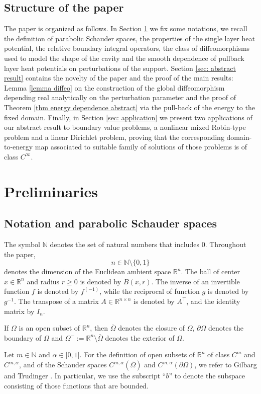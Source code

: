 \documentclass[11pt,reqno,a4paper]{amsart}
\theoremstyle{plain}
\theoremstyle{definition}
\newcommand{\R}{\mathbb{R}}
\begin{document}
\subsection{Structure of the paper} The paper is organized as follows. In Section \ref{s:prel} we fix some notations, we recall the definition of parabolic Schauder spaces, the properties of the single layer heat potential, the relative boundary integral operators, the class of diffeomorphisms used to model the shape of the cavity and the smooth dependence of pullback layer heat potentials on perturbations of the support. Section \ref{sec: abstract result} contains the novelty of the paper and the proof of the main results: Lemma \ref{lemma diffeo} on the construction of the global diffeomorphism depending real analytically on the perturbation parameter and the proof of Theorem \ref{thm energy dependence abstract} via the pull-back of the energy to the fixed domain. Finally, in Section \ref{sec: application} we present two applications of our abstract result to boundary value problems, a nonlinear mixed Robin-type problem and a linear Dirichlet problem, proving that the corresponding domain-to-energy map associated to suitable family of solutions of those problems is of class $C^\infty$. 

\section{Preliminaries}\label{s:prel}
\subsection{Notation and parabolic Schauder spaces}
The symbol $\mathbb{N}$ denotes the set of natural numbers that includes $0$. Throughout the paper,
\[
n \in \mathbb{N} \setminus \{0, 1\}
\]
denotes the dimension of the Euclidean ambient space $\mathbb{R}^n$. The ball of center $x \in \mathbb{R}^n$ and radius $r\geq 0$ is denoted by $B(x,r)$. The inverse of an
invertible function $f$ is denoted by $f^{(-1)}$, while the reciprocal of function $g$ is denoted by $g^{-1}$. The transpose of a matrix $A \in \R^{n\times n}$ is denoted by $A^\top$, and the identity matrix by $I_n$.

If $\Omega$ is an open subset of $\mathbb{R}^n$, then $\overline{\Omega}$ denotes
the closure of $\Omega$, $\partial \Omega$ denotes the boundary of $\Omega$ and $\Omega^- := \mathbb{R}^n \setminus \overline{\Omega}$ denotes the exterior of $\Omega$. 

Let $m\in \mathbb{N}$ and $\alpha \in ]0,1[$. For the definition of open subsets of $\mathbb{R}^n$ of class $C^m$
and $C^{m,\alpha}$, and of the Schauder spaces $C^{m,\alpha}(\overline{\Omega})$ and $C^{m,\alpha}(\partial \Omega)$, we refer to Gilbarg and
Trudinger \cite[p.\,52\,\&\,p.\,94]{GiTr83}. In particular, we use the subscript ``$b$'' to denote the subspace consisting of those functions that are bounded.
\end{document}
